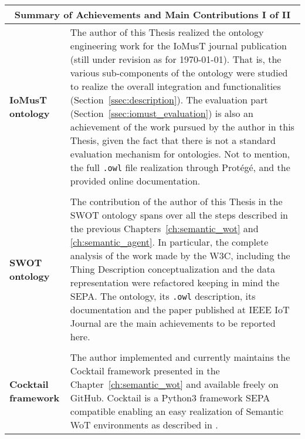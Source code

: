 \documentclass[11pt, twoside, openright]{report}   	%
\begin{document}
\newpage
\vspace*{\fill}
\begin{center}
\begin{tabular}{p{}p{}}
\toprule
\multicolumn{2}{c}{\Large \textbf{Summary of Achievements and Main Contributions I of II}} \\
\midrule
\textbf{IoMusT ontology} & The author of this Thesis realized the ontology engineering work for the IoMusT journal publication (still under revision as for \today). That is, the various sub-components of the ontology were studied to realize the overall integration and functionalities (Section~\ref{ssec:description}). The evaluation part (Section~\ref{ssec:iomust_evaluation}) is also an achievement of the work pursued by the author in this Thesis, given the fact that there is not a standard evaluation mechanism for ontologies. Not to mention, the full \texttt{.owl} file realization through Protégé, and the provided online documentation. \\
& \\
\textbf{SWOT ontology} & The contribution of the author of this Thesis in the SWOT ontology spans over all the steps described in the previous Chapters~\ref{ch:semantic_wot} and \ref{ch:semantic_agent}. In particular, the complete analysis of the work made by the W3C, including the Thing Description conceptualization and the data representation were refactored keeping in mind the SEPA. The ontology, its \texttt{.owl} description, its documentation and the paper published at IEEE IoT Journal \cite{antoniazzi2019building} are the main achievements to be reported here.\\
& \\
\textbf{Cocktail framework} & The author implemented and currently maintains the Cocktail framework presented in the Chapter~\ref{ch:semantic_wot} and available freely on GitHub. Cocktail is a Python3 framework SEPA compatible enabling an easy realization of Semantic WoT environments as described in \cite{antoniazzi2019building}. \\
\bottomrule
\end{tabular}
\end{center}
\vspace*{\fill}
\newpage
\vspace*{\fill}
\end{document}
